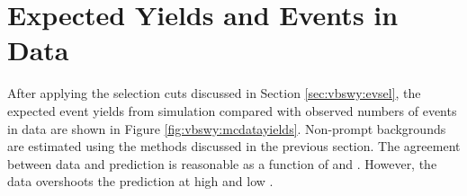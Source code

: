 \section{Expected Yields and Events in Data}

After applying the selection cuts discussed in Section \ref{sec:vbswy:evsel}, the expected event yields from simulation compared with observed numbers of events in data are shown in Figure \ref{fig:vbswy:mcdatayields}. Non-prompt backgrounds are estimated using the methods discussed in the previous section. The agreement between data and prediction is reasonable as a function of \mjj and \jjdphi. However, the data overshoots the prediction at high \mly and low \ptjj.%

